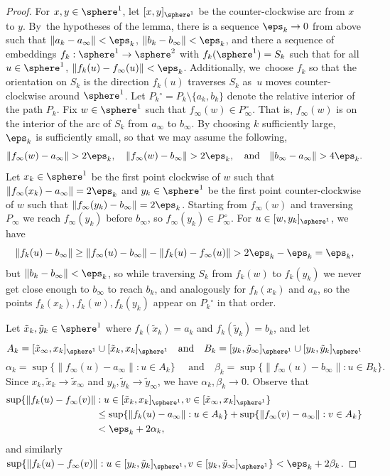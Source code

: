 \begin{proof}
For $x,y \in \sphere^1$, let $[x,y]_{\sphere^1}$ be the counter-clockwise arc from $x$ to $y$.
By~the hypotheses of the lemma, there is a sequence $\eps_k \to 0$ from above such that \hbox{$\|a_k - a_\infty\| < \eps_k$}, $\|b_k - b_\infty\| < \eps_k$,
and there a sequence of embeddings $f_k : \sphere^1 \to \sphere^2$ with $f_k(\sphere^1) = S_k$
such that for all $u \in \sphere^1$, $\|f_k(u) - f_\infty(u)\| < \eps_k $.
Additionally, we~choose $f_k$ so that the orientation on $S_k$ is the direction $f_k(u)$ traverses $S_k$ as~$u$ moves counter-clockwise around $\sphere^1$.
Let $P_k{}^\circ = P_k\setminus\{a_k,b_k\}$ denote the relative interior of the path $P_k$.
Fix $w \in \sphere^1$ such that ${f_\infty(w) \in P_\infty^{\,\circ}}$.
That is, $f_\infty(w)$ is on the interior of the arc of $S_k$ from $a_\infty$ to $b_\infty$.
By choosing $k$ sufficiently large, $\eps_{k}$ is sufficiently small, so that we may assume the following,
\[
\|f_\infty(w) -a_\infty\| > 2\eps_{k}, \quad
\|f_\infty(w) -b_\infty\| > 2\eps_{k}, \quad \text{and} \quad
\|b_\infty - a_\infty\| > 4\eps_k.
\]
Let $x_k \in \sphere^1$ be the first point clockwise of $w$ such that
$\|f_\infty(x_k) - a_\infty\| = 2\eps_k$
and $y_k \in \sphere^1$ be the first point counter-clockwise of $w$ such that
$\|f_\infty(y_k) - b_\infty\| = 2\eps_k$.
Starting from $f_\infty(w)$ and traversing $P_\infty$ we reach $f_\infty(y_k)$ before $b_\infty$, so
$f_\infty(y_k) \in P_\infty^{\,\circ}$.
For $u \in [w,y_k]_{\sphere^1}$, we have
\[ \|f_k(u) - b_\infty\| \geq \| f_\infty(u) - b_\infty \| - \|f_k(u) -f_\infty(u)\| > 2\eps_k -\eps_k = \eps_k, \]
but $\|b_k - b_\infty\| < \eps_k$, so while traversing $S_k$ from $f_k(w)$ to $f_k(y_k)$ we never get close enough to $b_\infty$ to reach $b_k$,
and analogously for $f_k(x_k)$ and $a_k$,
so the points $f_k(x_k),f_k(w),f_k(y_k)$ appear on $P_k{}^\circ$ in that order.

Let $\tilde x_k, \tilde y_k \in \sphere^1$ where $f_k (\tilde x_k) = a_k$ and $f_k (\tilde y_k) = b_k$, and
let
\[ A_k = [\tilde x_\infty,x_k]_{\sphere^1} \cup [\tilde x_k,x_k]_{\sphere^1} \quad \text{and}\quad
B_k = [y_k, \tilde y_\infty]_{\sphere^1} \cup [y_k, \tilde y_k]_{\sphere^1}
\]
\[ \alpha_k = \sup \{ \|f_\infty(u)-a_\infty\| :u \in A_k \} \quad \text{ and} \quad
\beta_k = \sup \{ \|f_\infty(u)-b_\infty\| :u \in B_k \}.
\]
Since $x_k,\tilde x_k \to \tilde x_\infty$ and $y_k, \tilde y_k \to \tilde y_\infty$, we have $\alpha_k,\beta_k \to 0$. Observe that
\begin{align*}
\sup \{ \|f_k(u)-f_\infty(v)\| &:u \in [\tilde x_k,x_k]_{\sphere^1},v \in [\tilde x_\infty,x_k]_{\sphere^1} \} \\
& \leq \sup \{ \|f_k(u) -a_\infty \| : u \in A_k \} + \sup \{ \|f_\infty(v) -a_\infty \| : v \in A_k \} \\
& < \eps_k +2\alpha_k,
\end{align*}
and similarly
$\sup \{ \|f_k(u)-f_\infty(v)\| :u \in [y_k,\tilde y_k]_{\sphere^1},v \in [y_k,\tilde y_\infty]_{\sphere^1} \} < \eps_k +2\beta_k $.


\end{proof}
